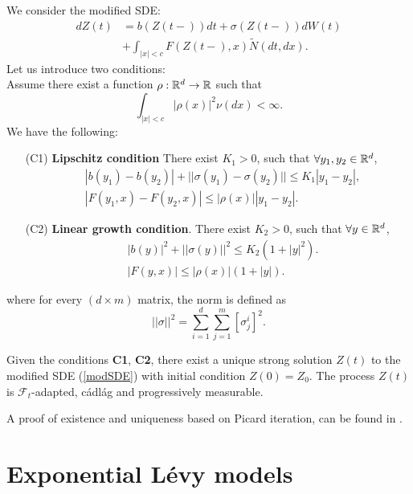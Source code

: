 We consider the modified SDE:
\begin{align} \label{modSDE}
 dZ(t) &= b(Z(t-)) dt  + \sigma(Z(t-)) dW(t)\\ \nonumber
     &+ \int_{|x|<c} F(Z(t-),x) \tilde N (dt,dx).
\end{align}
Let us introduce two conditions:\\
Assume there exist a function $\rho : \mathbb{R}^d\to \mathbb{R} $ such that
\begin{equation}\label{rho}
 \int_{|x|<c} |\rho(x)|^2 \nu(dx) < \infty.
\end{equation}
We have the following:
\begin{itemize}
 \item[(C1)] \textbf{Lipschitz condition} There exist $K_1 >0$, such that $\forall y_1,y_2 \in \mathbb{R}^d$,
 \begin{align}\label{Lipschitz}
  &|b(y_1) - b(y_2)| + || \sigma(y_1) - \sigma(y_2) || \leq K_1|y_1-y_2|,\\ 
  & |F(y_1,x)-F(y_2,x)| \leq |\rho(x)||y_1-y_2|. \label{Lipschitz2}
 \end{align}

 \item[(C2)] \textbf{Linear growth condition}. There exist $K_2>0$, such that $\forall y \in \mathbb{R}^d$,
 \begin{align}\label{Growth}
  &|b(y)|^2 + ||\sigma(y)||^2 \leq K_2 (1+|y|^2).\\ 
  & |F(y,x)| \leq |\rho(x)| (1+|y|). \label{Growth2}
 \end{align}
\end{itemize}

where for every $(d \times m)$ matrix, the norm is defined as 
$$|| \sigma ||^2 = \sum_{i=1}^d \sum_{j=1}^m [\sigma_j^i]^2.$$

\begin{Theorem}
 Given the conditions \textbf{C1}, \textbf{C2}, there exist a unique strong solution $Z(t)$ to the modified SDE (\ref{modSDE}) with initial condition $Z(0)=Z_{0}$.
 The process $Z(t)$ is $\mathcal{F}_t$-adapted, cádlág and progressively measurable. 
\end{Theorem}
A proof of existence and uniqueness based on Picard iteration, can be found in \cite{Applebaum}. 



\section{Exponential Lévy models}

